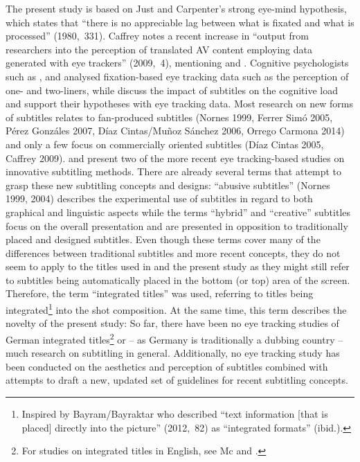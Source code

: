 \documentclass[output=paper]{langsci/langscibook}
\begin{document}
The present study is based on Just and Carpenter’s strong eye-mind hypothesis, which states that “there is no appreciable lag between what is fixated and what is processed” (1980,~331). Caffrey notes a recent increase in “output from researchers into the perception of translated AV content employing data generated with eye trackers” (2009,~4), mentioning \citet{moran2008} and \citet{delmissier2008}. Cognitive psychologists such as \citet{dydewalle1985}, \citet{koolstra1999lengthening} and \citet{Bruycker2007} analysed fixation-based eye tracking data such as the perception of one- and two-liners, while \citet{kruger2013} discuss the impact of subtitles on the cognitive load and support their hypotheses with eye tracking data. Most research on new forms of subtitles relates to fan-produced subtitles (Nornes 1999, Ferrer Simó 2005, Pérez Gonzáles 2007, Díaz Cintas/Muñoz Sánchez 2006, Orrego Carmona 2014) and only a few focus on commercially oriented subtitles (Díaz Cintas 2005, Caffrey 2009). \citet{caffrey2009} and \citet{mcclarty2012, mcclarty2013a, mcclarty2013b} present two of the more recent eye tracking-based studies on innovative subtitling methods. There are already several terms that attempt to grasp these new subtitling concepts and designs: “abusive subtitles” (Nornes 1999, 2004) describes the experimental use of subtitles in regard to both graphical and linguistic aspects while the terms “hybrid” \citep{cintas2006} and “creative” \citep{mcclarty2012} subtitles focus on the overall presentation and are presented in opposition to traditionally placed and designed subtitles. Even though these terms cover many of the differences between traditional subtitles and more recent concepts, they do not seem to apply to the titles used in \citet{fox2012} and the present study as they might still refer to subtitles being automatically placed in the bottom (or top) area of the screen. Therefore, the term “integrated titles” \citep{fox2012} was used, referring to titles being integrated\footnote{Inspired by Bayram/Bayraktar who described “text information [that is placed] directly into the picture” (2012,~82) as “integrated formats” (ibid.).\par 
} into the shot composition. At the same time, this term describes the novelty of the present study: So far, there have been no eye tracking studies of German integrated titles\footnote{For studies on integrated titles in English, see Mc\citet{mcclarty2013b} and \citet{brown2015}.\par 
} or –  as Germany is traditionally a dubbing country – much research on subtitling in general. Additionally, no eye tracking study has been conducted on the aesthetics and perception of subtitles combined with attempts to draft a new, updated set of guidelines for recent subtitling concepts.
\end{document}
